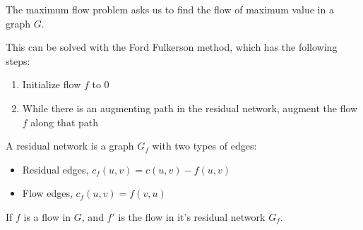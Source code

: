\documentclass[12pt,letterpaper]{article}
\theoremstyle{definition}
\begin{document}
The maximum flow problem asks us to find the flow of maximum value in a graph $G$.

This can be solved with the Ford Fulkerson method, which has the following steps:

\begin{enumerate}
  \item Initialize flow $f$ to 0
  \item While there is an augmenting path in the residual network, augment the flow $f$ along that path
\end{enumerate}

A residual network is a graph $G_f$ with two types of edges:

\begin{itemize}
  \item Residual edges, $c_f(u,v) = c(u,v) - f(u,v)$
  \item Flow edges, $c_f(u,v) = f(v,u)$
\end{itemize}

If $f$ is a flow in $G$, and $f'$ is the flow in it's residual network $G_f$.
\end{document}
